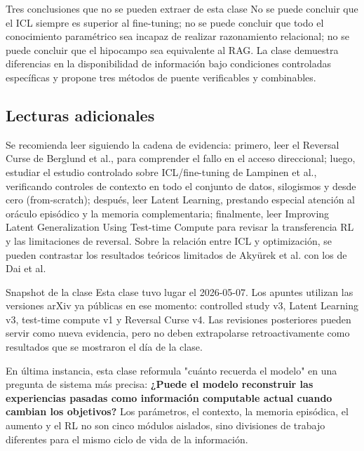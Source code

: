 \documentclass[a4paper]{article}
\begin{document}
\begin{warningbox}{Tres conclusiones que no se pueden extraer de esta clase}
No se puede concluir que el ICL siempre es superior al fine-tuning; no se puede concluir que todo el conocimiento paramétrico sea incapaz de realizar razonamiento relacional; no se puede concluir que el hipocampo sea equivalente al RAG. La clase demuestra diferencias en la disponibilidad de información bajo condiciones controladas específicas y propone tres métodos de puente verificables y combinables.
\end{warningbox}

\subsection{Lecturas adicionales}

Se recomienda leer siguiendo la cadena de evidencia: primero, leer el Reversal Curse de Berglund et al., para comprender el fallo en el acceso direccional; luego, estudiar el estudio controlado sobre ICL/fine-tuning de Lampinen et al., verificando controles de contexto en todo el conjunto de datos, silogismos y desde cero (from-scratch); después, leer Latent Learning, prestando especial atención al oráculo episódico y la memoria complementaria; finalmente, leer Improving Latent Generalization Using Test-time Compute para revisar la transferencia RL y las limitaciones de reversal. Sobre la relación entre ICL y optimización, se pueden contrastar los resultados teóricos limitados de Akyürek et al. con los de Dai et al.

\begin{knowledgebox}{Snapshot de la clase}
Esta clase tuvo lugar el 2026-05-07. Los apuntes utilizan las versiones arXiv ya públicas en ese momento: controlled study v3, Latent Learning v3, test-time compute v1 y Reversal Curse v4. Las revisiones posteriores pueden servir como nueva evidencia, pero no deben extrapolarse retroactivamente como resultados que se mostraron el día de la clase.
\end{knowledgebox}

En última instancia, esta clase reformula "cuánto recuerda el modelo" en una pregunta de sistema más precisa: \textbf{¿Puede el modelo reconstruir las experiencias pasadas como información computable actual cuando cambian los objetivos?} Los parámetros, el contexto, la memoria episódica, el aumento y el RL no son cinco módulos aislados, sino divisiones de trabajo diferentes para el mismo ciclo de vida de la información.
\end{document}

